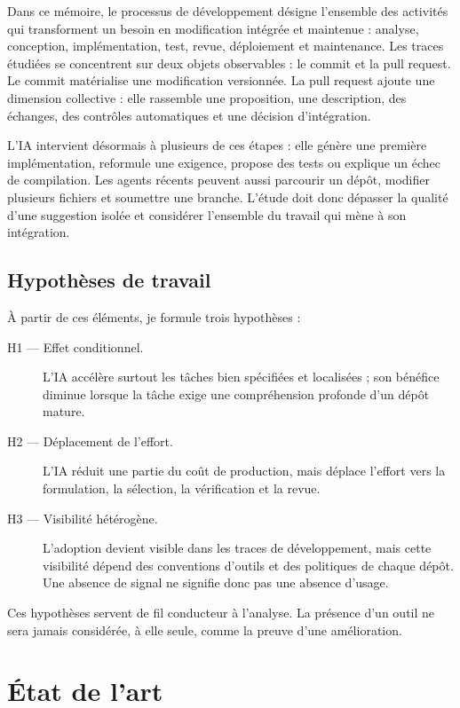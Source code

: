 \documentclass[12pt,a4paper,oneside]{report}
\begin{document}
Dans ce mémoire, le processus de développement désigne l'ensemble des activités qui transforment un besoin en modification intégrée et maintenue : analyse, conception, implémentation, test, revue, déploiement et maintenance. Les traces étudiées se concentrent sur deux objets observables : le commit et la pull request. Le commit matérialise une modification versionnée. La pull request ajoute une dimension collective : elle rassemble une proposition, une description, des échanges, des contrôles automatiques et une décision d'intégration.

L'IA intervient désormais à plusieurs de ces étapes : elle génère une première implémentation, reformule une exigence, propose des tests ou explique un échec de compilation. Les agents récents peuvent aussi parcourir un dépôt, modifier plusieurs fichiers et soumettre une branche. L'étude doit donc dépasser la qualité d'une suggestion isolée et considérer l'ensemble du travail qui mène à son intégration.

\section{Hypothèses de travail}

À partir de ces éléments, je formule trois hypothèses :
\begin{description}
  \item[H1 --- Effet conditionnel.] L'IA accélère surtout les tâches bien spécifiées et localisées ; son bénéfice diminue lorsque la tâche exige une compréhension profonde d'un dépôt mature.
  \item[H2 --- Déplacement de l'effort.] L'IA réduit une partie du coût de production, mais déplace l'effort vers la formulation, la sélection, la vérification et la revue.
  \item[H3 --- Visibilité hétérogène.] L'adoption devient visible dans les traces de développement, mais cette visibilité dépend des conventions d'outils et des politiques de chaque dépôt. Une absence de signal ne signifie donc pas une absence d'usage.
\end{description}

Ces hypothèses servent de fil conducteur à l'analyse. La présence d'un outil ne sera jamais considérée, à elle seule, comme la preuve d'une amélioration.

\chapter{État de l'art}
\end{document}
